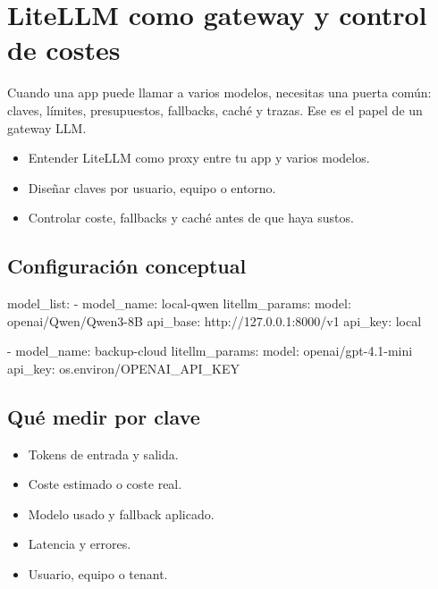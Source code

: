 \documentclass[11pt,a4paper]{book}
\begin{document}
\chapter{LiteLLM como gateway y control de costes}
Cuando una app puede llamar a varios modelos, necesitas una puerta común: claves, límites, presupuestos, fallbacks, caché y trazas. Ese es el papel de un gateway LLM.

\begin{itemize}\item Entender LiteLLM como proxy entre tu app y varios modelos.\end{itemize}
\begin{itemize}\item Diseñar claves por usuario, equipo o entorno.\end{itemize}
\begin{itemize}\item Controlar coste, fallbacks y caché antes de que haya sustos.\end{itemize}
\section{Configuración conceptual}
\begin{codebox}
model_list:
  - model_name: local-qwen
    litellm_params:
      model: openai/Qwen/Qwen3-8B
      api_base: http://127.0.0.1:8000/v1
      api_key: local

  - model_name: backup-cloud
    litellm_params:
      model: openai/gpt-4.1-mini
      api_key: os.environ/OPENAI_API_KEY
\end{codebox}
\section{Qué medir por clave}
\begin{itemize}\item Tokens de entrada y salida.\end{itemize}
\begin{itemize}\item Coste estimado o coste real.\end{itemize}
\begin{itemize}\item Modelo usado y fallback aplicado.\end{itemize}
\begin{itemize}\item Latencia y errores.\end{itemize}
\begin{itemize}\item Usuario, equipo o tenant.\end{itemize}
\end{document}
